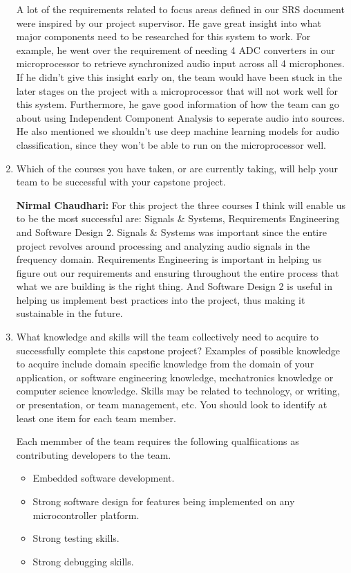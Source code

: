 \begin{enumerate}
  A lot of the requirements related to focus areas defined in our SRS document 
  were inspired by our project supervisor. He gave great insight into what major
  components need to be researched for this system to work. For example, he went 
  over the requirement of needing 4 ADC converters in our microprocessor to 
  retrieve synchronized audio input across all 4 microphones. If he didn't give 
  this insight early on, the team would have been stuck in the later stages on 
  the project with a microprocessor that will not work well for this system. 
  Furthermore, he gave good information of how the team can go about using 
  Independent Component Analysis to seperate audio into sources. He also 
  mentioned we shouldn't use deep machine learning models for audio 
  classification, since they won't be able to run on the microprocessor well. 

  
  \item Which of the courses you have taken, or are currently taking, will help
  your team to be successful with your capstone project.

  \textbf{Nirmal Chaudhari: } For this project the three courses I think will 
  enable us to be the most successful are: Signals \& Systems, Requirements 
  Engineering and Software Design 2. Signals \& Systems was important since the 
  entire project revolves around processing and analyzing audio signals in the 
  frequency domain. Requirements Engineering is important in helping us figure 
  out our requirements and ensuring throughout the entire process that what we 
  are building is the right thing. And Software Design 2 is useful in helping 
  us implement best practices into the project, thus making it sustainable 
  in the future. 

  \item What knowledge and skills will the team collectively need to acquire to
  successfully complete this capstone project?  Examples of possible knowledge
  to acquire include domain specific knowledge from the domain of your
  application, or software engineering knowledge, mechatronics knowledge or
  computer science knowledge.  Skills may be related to technology, or writing,
  or presentation, or team management, etc.  You should look to identify at
  least one item for each team member.

  Each memmber of the team requires the following qualfiications as contributing
   developers to the team.

  \begin{itemize}
    \item Embedded software development.
    \item Strong software design for features being implemented on any 
    microcontroller platform. 
    \item Strong testing skills.
    \item Strong debugging skills. 
  \end{itemize}


\end{enumerate}
